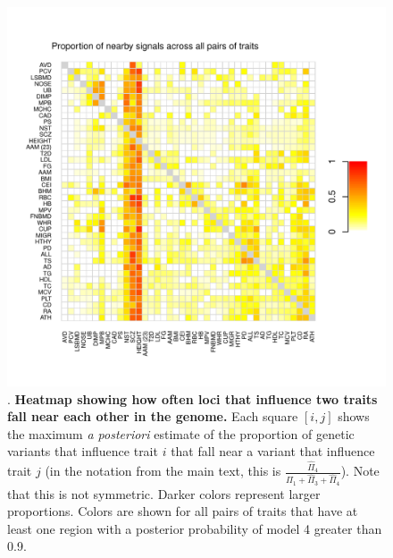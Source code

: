 \documentclass[11pt,titlepage]{article}
\begin{document}
\begin{figure}
\begin{center}
\includegraphics[scale = 0.6]{figs/heatmap_pi4.pdf}
\caption{. \textbf{Heatmap showing how often loci that influence two traits fall near each other in the genome.} Each square $[i,j]$ shows the maximum \emph{a posteriori} estimate of the proportion of genetic variants that influence trait $i$ that fall near a variant that influence trait $j$ (in the notation from the main text, this is $\frac{\hat \Pi_4}{\hat \Pi_1 + \hat \Pi_3 + \hat \Pi_4}$). Note that this is not symmetric. Darker colors represent larger proportions. Colors are shown for all pairs of traits that have at least one region with a posterior probability of model 4 greater than 0.9.}\label{f_pi4}
\end{center}
\end{figure}
\end{document}
